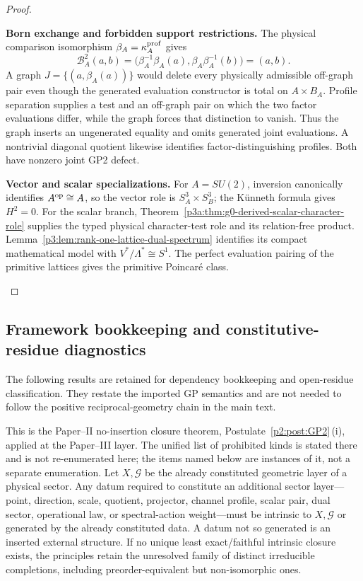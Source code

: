 \documentclass[11pt,a4paper]{article}
\begin{document}
\begin{proof}
\begin{proofsteps}
\item \textbf{Born exchange and forbidden support restrictions.}
The physical comparison isomorphism
\(\beta_A=\kappa_A^{\rm prof}\) gives
\[
 \mathcal B_A^2(a,b)
 =\bigl(\beta_A^{-1}\beta_A(a),
        \beta_A\beta_A^{-1}(b)\bigr)
 =(a,b).
\]
A graph \(J=\{(a,\beta_A(a))\}\) would delete every physically admissible
off-graph pair even though the generated evaluation constructor is total on
\(A\times B_A\).  Profile separation supplies a test and an off-graph pair on
which the two factor evaluations differ, while the graph forces that
distinction to vanish.  Thus the graph inserts an ungenerated equality and
omits generated joint evaluations.  A nontrivial diagonal quotient likewise
identifies factor-distinguishing profiles.  Both have nonzero joint GP2 defect.

\item \textbf{Vector and scalar specializations.}
For \(A=SU(2)\), inversion canonically identifies \(A^{\rm op}\cong A\), so
the vector role is \(S^3_A\times S^3_B\); the K\"unneth formula gives
\(H^2=0\).  For the scalar branch,
Theorem~\ref{p3a:thm:g0-derived-scalar-character-role} supplies the typed
physical character-test role and its relation-free product.
Lemma~\ref{p3:lem:rank-one-lattice-dual-spectrum} identifies its compact
mathematical model with \(V^*/\Lambda^*\cong S^1\).  The perfect evaluation
pairing of the primitive lattices gives the primitive Poincar\'e class.
\end{proofsteps}
\end{proof}

\subsection{Framework bookkeeping and constitutive-residue diagnostics}
\label{p3a:app:framework-bookkeeping}
The following results are retained for dependency bookkeeping and open-residue
classification.  They restate the imported GP semantics and are not needed to
follow the positive reciprocal-geometry chain in the main text.

\begin{theorem}
\label{p3:thm:no-insertion-closure-from-GP2}
This is the Paper--II no-insertion closure theorem, Postulate~\ref{p2:post:GP2}\,(i), applied at the Paper--III layer.  The unified list of prohibited kinds is stated there and is not re-enumerated here; the items named below are instances of it, not a separate enumeration.  Let \(X,\mathcal G\) be the already constituted geometric layer of a physical sector.  Any datum required to constitute an additional sector layer---point, direction, scale, quotient, projector, channel profile, scalar pair, dual sector, operational law, or spectral-action weight---must be intrinsic to \(X,\mathcal G\) or generated by the already constituted data.  A datum not so generated is an inserted external structure.  If no unique least exact/faithful intrinsic closure exists, the principles retain the unresolved family of distinct irreducible completions, including preorder-equivalent but non-isomorphic ones.
\end{theorem}
\end{document}
